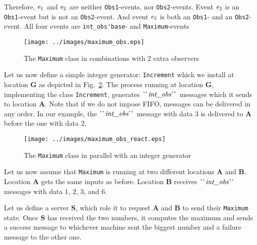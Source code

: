 \documentclass[final]{article}
\begin{document}
Therefore, $\mathit{e}_1$ and $\mathit{e}_2$ are neither
\lstinline{Obs1}-events, nor \lstinline{Obs2}-events.  Event
$\mathit{e}_2$ is an \lstinline{Obs1}-event but is not an
\lstinline{Obs2}-event.  And event $\mathit{e}_3$ is both an
\lstinline{Obs1}- and an \lstinline{Obs2}-event.
%
All four events are \lstinline{int_obs'base}- and
\lstinline{Maximum}-events

\begin{figure}[!h]
  \begin{center}
    \texttt{[image: ../images/maximum\_obs.eps]}
  \end{center}
  \caption{The \lstinline{Maximum} class in combinations with 2 extra observers}
  \label{fig:maximum+obs}
\end{figure}



Let us now define a simple integer generator: \lstinline{Increment}
which we install at location \textbf{G} as depicted in
Fig.~\ref{fig:maximum+gen}.  The process running at location
\textbf{G}, implementing the class \lstinline{Increment}, generates
$\CONSatoms{int\_obs}$ messages which it sends to location \textbf{A}.
Note that if we do not impose FIFO, messages can be delivered in any
order.  In our example, the $\CONSatoms{int\_obs}$ message with data
$3$ is delivered to \textbf{A} before the one with data $2$.

\begin{figure}[!h]
  \begin{center}
    \texttt{[image: ../images/maximum\_obs\_react.eps]}
  \end{center}
  \caption{The \lstinline{Maximum} class in parallel with an integer generator}
  \label{fig:maximum+gen}
\end{figure}


Let us now assume that \lstinline{Maximum} is running at two different
locations \textbf{A} and \textbf{B}.  Location \textbf{A} gets the
same inputs as before.  Location \textbf{B} receives
$\CONSatoms{int\_obs}$ messages with data $1$, $2$, $3$, and $6$.

Let us define a server \textbf{S}, which role it to request \textbf{A}
and \textbf{B} to send their \lstinline{Maximum} state.  Once
\textbf{S} has received the two numbers, it computes the maximum and
sends a success message to whichever machine sent the biggest number
and a failure message to the other one.
\end{document}
